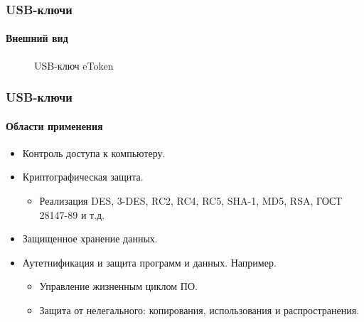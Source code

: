 \begin{frame}
    \frametitle{USB-ключи}
    \framesubtitle{Внешний вид}
    
    \begin{figure}
        \begin{center}
            \caption{USB-ключ eToken}\label{pict:etoken}
        \end{center}
    \end{figure} 
    
\end{frame}


\begin{frame}
    \frametitle{USB-ключи}
    \framesubtitle{Области применения}
    
    \begin{itemize}
        \item Контроль доступа к компьютеру.
        \item Криптографическая защита.
        \begin{itemize}
            \item Реализация DES, 3-DES, RC2, RC4, RC5, SHA-1, MD5, RSA, ГОСТ 28147-89 и т.д.
        \end{itemize} 
        \item Защищенное хранение данных.
        \item Аутетнификация и защита программ и данных. Например.
        \begin{itemize}
            \item Управление жизненным циклом ПО.
            \item Защита от нелегального: копирования, использования и распространения.
        \end{itemize} 
    \end{itemize} 
\end{frame}


